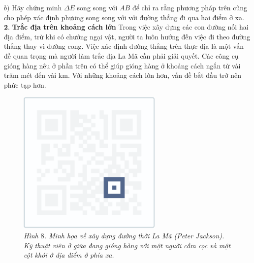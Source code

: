 \begin{multicols}{2}
\begin{figure}[H]
		\vspace*{-10pt}
	\end{figure}
	$b)$ Hãy chứng minh $\Delta E$ song song với $AB$ để chỉ ra rằng phương pháp trên cũng cho phép xác định phương song song với với đường thẳng đi qua hai điểm ở xa.
	\vskip 0.1cm
	$\pmb{2.}$ \textbf{\color{toanhocdoisong}Trắc địa trên khoảng cách lớn}
	\vskip 0.1cm
	Trong việc xây dựng các con đường nối hai địa điểm, trừ khi có chướng ngại vật, người ta luôn hướng đến việc đi theo đường thẳng thay vì đường cong. Việc xác định đường thẳng trên thực địa là một vấn đề quan trọng mà người làm trắc địa La Mã cần phải giải quyết. Các công cụ gióng hàng nêu ở phần trên có thể giúp gióng hàng ở khoảng cách ngắn từ vài trăm mét đến vài km. Với những khoảng cách lớn hơn, vấn đề bắt đầu trở nên phức tạp hơn.
	\begin{figure}[H]
		\vspace*{-5pt}
		\centering
		\captionsetup{labelformat= empty, justification=centering}
		\includegraphics[height= 0.8\linewidth]{8}
		\caption{\small\textit{\color{toanhocdoisong}Hình $8$. Minh họa về xây dựng đường thời La Mã (Peter Jackson). Kỹ thuật viên ở giữa đang gióng hàng với một người cầm cọc và một cột khói ở địa điểm ở phía xa.}}

\end{figure}
\end{multicols}
